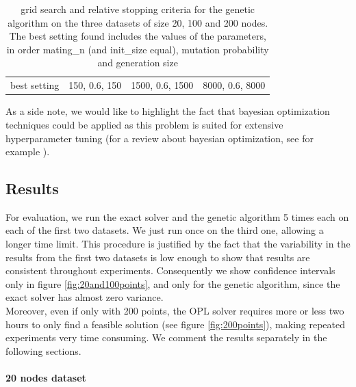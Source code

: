 \documentclass{article}
\begin{document}
\begin{table}[]
\begin{tabular}{@{}llll@{}}
\multicolumn{1}{l|}{best setting}                                                        & \multicolumn{1}{l|}{150, 0.6, 150}                                                                 & \multicolumn{1}{l|}{1500, 0.6, 1500}                                                               & \multicolumn{1}{l|}{8000, 0.6, 8000}                                                                \\ \cmidrule(l){2-4} 
\end{tabular}
\caption{grid search and relative stopping criteria for the genetic algorithm on the three datasets of size 20, 100 and 200 nodes. The best setting found includes the values of the parameters, in order mating\_n (and init\_size equal), mutation probability and generation size}
\label{tab: parameters selection}
\end{table}

As a side note, we would like to highlight the fact that bayesian optimization techniques could be applied as this problem is suited for extensive hyperparameter tuning (for a review about bayesian optimization, see for example \cite{shahriari2015taking}).

\subsection{Results}
For evaluation, we run the exact solver and the genetic algorithm 5 times each on each of the first two datasets. We just run once on the third one, allowing a longer time limit. This procedure is justified by the fact that the variability in the results from the first two datasets is low enough to show that results are consistent throughout experiments. Consequently we show confidence intervals only in figure \ref{fig:20and100points}, and only for the genetic algorithm, since the exact solver has almost zero variance. \\
Moreover, even if only with 200 points, the OPL solver requires more or less two hours to only find a feasible solution (see figure \ref{fig:200points}), making repeated experiments very time consuming. We comment the results separately in the following sections.

\paragraph*{20 nodes dataset}
\end{document}
